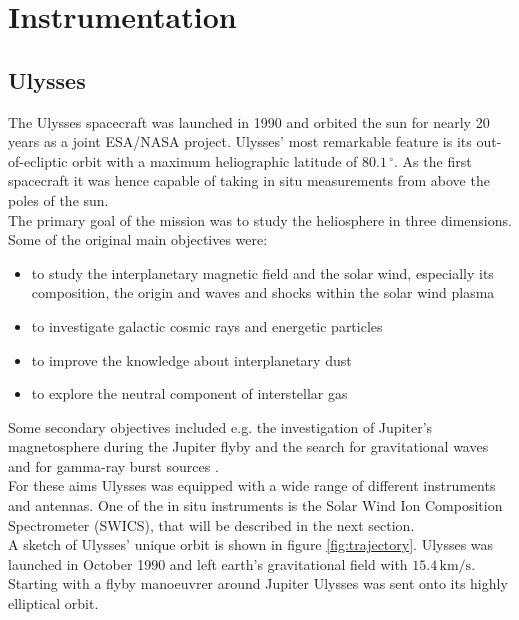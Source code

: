 
\chapter{Instrumentation} %

\label{ChapterInstrumentation} 



\section{Ulysses}
\label{sec:ulysses}
The Ulysses spacecraft \citep{wenzel_ulysses} was launched in 1990 and orbited the sun for nearly 20 years as a joint ESA/NASA project.
Ulysses' most remarkable feature is its out-of-ecliptic orbit with a maximum heliographic latitude of $80.1\,^\circ$.
As the first spacecraft it was hence capable of taking in situ measurements from above the poles of the sun.\\
The primary goal of the mission was to study the heliosphere in three dimensions. Some of the original main objectives were:
\begin{itemize}
	\item to study the interplanetary magnetic field and the solar wind, especially its composition, the origin and waves and shocks within the solar wind plasma
	\item to investigate galactic cosmic rays and energetic particles
	\item to improve the knowledge about interplanetary dust
	\item to explore the neutral component of interstellar gas
\end{itemize}
Some secondary objectives included e.g. the investigation of Jupiter's magnetosphere during the Jupiter flyby and the search for gravitational waves and for gamma-ray burst sources \citep{wenzel_ulysses}.
\\
For these aims Ulysses was equipped with a wide range of different instruments and antennas. One of the in situ instruments is the Solar Wind Ion Composition Spectrometer (SWICS), that will be described in the next section.\\
A sketch of Ulysses' unique orbit is shown in figure \ref{fig:trajectory}.
Ulysses was launched in October 1990 and left earth's gravitational field with $15.4\,\mathrm{km/s}$. Starting with a flyby manoeuvrer around Jupiter Ulysses was sent onto its highly elliptical orbit.
